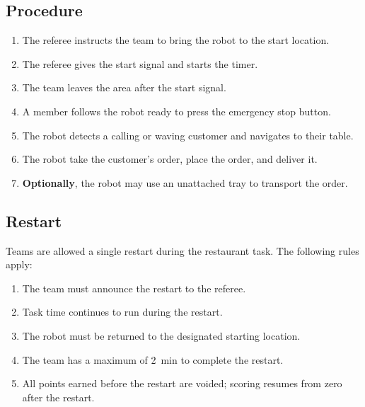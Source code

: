 \subsection*{Procedure}

\begin{enumerate}
	\item The referee instructs the team to bring the robot to the start location.
	\item The referee gives the start signal and starts the timer.
	\item The team leaves the area after the start signal.
	\item A \TC{} member follows the robot ready to press the emergency stop button. 
	\item The robot detects a calling or waving customer and navigates to their table.
	\item The robot take the customer's order, place the order, and deliver it.
	\item \textbf{Optionally}, the robot may use an unattached tray to transport the order.
\end{enumerate}

\subsection{Restart}
Teams are allowed a single restart during the restaurant task. The following rules apply:

\begin{enumerate}[nosep]
  \item The team must announce the restart to the referee.
  \item Task time continues to run during the restart.
  \item The robot must be returned to the designated starting location.
  \item The team has a maximum of \SI{2}{\minute} to complete the restart.
  \item All points earned before the restart are voided; scoring resumes from zero after the restart.
\end{enumerate}


